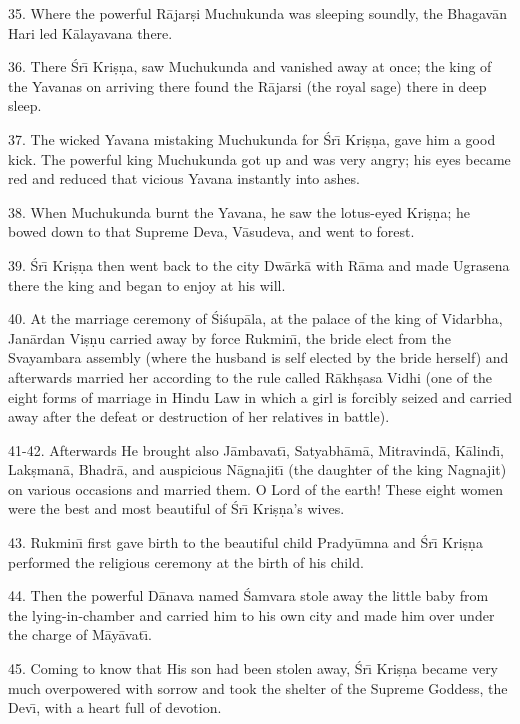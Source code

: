 35. Where the powerful R\=ajar\d{s}i Muchukunda was sleeping soundly, the Bhagav\=an Hari led K\=alayavana there.

36. There \'Sr\={\i} Kri\d{s}\d{n}a, saw Muchukunda and vanished away at once; the king of the Yavanas on arriving there found the R\=ajarsi (the royal sage) there in deep sleep.

37. The wicked Yavana mistaking Muchukunda for \'Sr\={\i} Kri\d{s}\d{n}a, gave him a good kick. The powerful king Muchukunda got up and was very angry; his eyes became red and reduced that vicious Yavana instantly into ashes.

38. When Muchukunda burnt the Yavana, he saw the lotus-eyed Kri\d{s}\d{n}a; he bowed down to that Supreme Deva, V\=asudeva, and went to forest.

39. \'Sr\={\i} Kri\d{s}\d{n}a then went back to the city Dw\=ark\=a with R\=ama and made Ugrasena there the king and began to enjoy at his will.

40. At the marriage ceremony of \'Si\'sup\=ala, at the palace of the king of Vidarbha, Jan\=ardan Vi\d{s}\d{n}u carried away by force Rukmin\={\i}, the bride elect from the Svayambara assembly (where the husband is self elected by the bride herself) and afterwards married her according to the rule called R\=akh\d{s}asa Vidhi (one of the eight forms of marriage in Hindu Law in which a girl is forcibly seized and carried away after the defeat or destruction of her relatives in battle).

41-42. Afterwards He brought also J\=ambavat\={\i}, Satyabh\=am\=a, Mitravind\=a, K\=alind\={\i}, Lak\d{s}man\=a, Bhadr\=a, and auspicious N\=agnajit\={\i} (the daughter of the king Nagnajit) on various occasions and married them. O Lord of the earth! These eight women were the best and most beautiful of \'Sr\={\i} Kri\d{s}\d{n}a's wives.

43. Rukmin\={\i} first gave birth to the beautiful child Prady\=umna and \'Sr\={\i} Kri\d{s}\d{n}a performed the religious ceremony at the birth of his child.

44. Then the powerful D\=anava named \'Samvara stole away the little baby from the lying-in-chamber and carried him to his own city and made him over under the charge of M\=ay\=avat\={\i}.

45. Coming to know that His son had been stolen away, \'Sr\={\i} Kri\d{s}\d{n}a became very much overpowered with sorrow and took the shelter of the Supreme Goddess, the Dev\={\i}, with a heart full of devotion.

